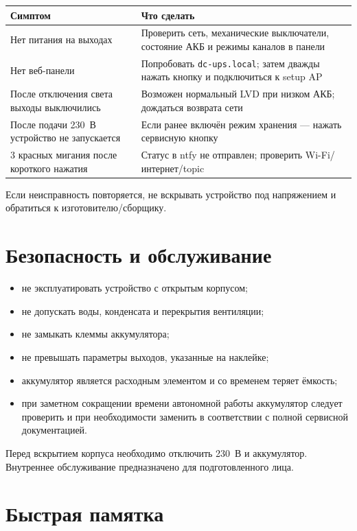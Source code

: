 \documentclass[10.5pt,a5paper]{article}
\begin{document}
\begin{tabularx}{\textwidth}{@{}p{43mm}X@{}}
\toprule
\textbf{Симптом} & \textbf{Что сделать} \\
\midrule
Нет питания на выходах & Проверить сеть, механические выключатели, состояние АКБ и режимы каналов в панели \\
Нет веб-панели & Попробовать \texttt{dc-ups.local}; затем дважды нажать кнопку и подключиться к setup AP \\
После отключения света выходы выключились & Возможен нормальный LVD при низком АКБ; дождаться возврата сети \\
После подачи 230~В устройство не запускается & Если ранее включён режим хранения  --- нажать сервисную кнопку \\
3 красных мигания после короткого нажатия & Статус в ntfy не отправлен; проверить Wi-Fi/интернет/topic \\
\bottomrule
\end{tabularx}

Если неисправность повторяется, не вскрывать устройство под напряжением и обратиться к изготовителю/сборщику.

\section{Безопасность и обслуживание}

\begin{itemize}
  \item не эксплуатировать устройство с открытым корпусом;
  \item не допускать воды, конденсата и перекрытия вентиляции;
  \item не замыкать клеммы аккумулятора;
  \item не превышать параметры выходов, указанные на наклейке;
  \item аккумулятор является расходным элементом и со временем теряет ёмкость;
  \item при заметном сокращении времени автономной работы аккумулятор следует проверить и при необходимости заменить в соответствии с полной сервисной документацией.
\end{itemize}

\begin{warnbox}
Перед вскрытием корпуса необходимо отключить 230~В и аккумулятор. Внутреннее обслуживание предназначено для подготовленного лица.
\end{warnbox}

\newpage
\section*{Быстрая памятка}
\end{document}
